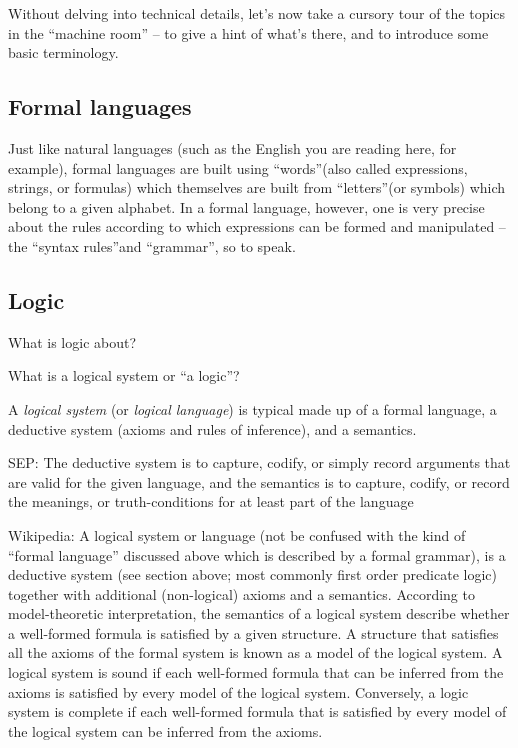 Without delving into technical details, let's now take a cursory tour of the topics in the ``machine room'' -- to give a hint of what's there, and to introduce some basic terminology.

\subsection{Formal languages}

Just like natural languages (such as the English you are reading here, for example), formal languages are built using ``words''(also called expressions, strings, or formulas) which themselves are built from ``letters''(or symbols) which belong to a given alphabet.
In a formal language, however, one is very precise about the rules according to which expressions can be formed and manipulated -- the ``syntax rules''and ``grammar'', so to speak.


\subsection{Logic}

What is logic about?

What is a logical system or ``a logic''?

A \emph{logical system} (or \emph{logical language}) is typical made up of a formal language, a deductive system (axioms and rules of inference), and a semantics.

SEP: The deductive system is to capture, codify, or simply record arguments that are valid for the given language, and the semantics is to capture, codify, or record the meanings, or truth-conditions for at least part of the language

Wikipedia: A logical system or language (not be confused with the kind of ``formal language'' discussed above which is described by a formal grammar), is a deductive system (see section above; most commonly first order predicate logic) together with additional (non-logical) axioms and a semantics.
According to model-theoretic interpretation, the semantics of a logical system describe whether a well-formed formula is satisfied by a given structure.
A structure that satisfies all the axioms of the formal system is known as a model of the logical system.
A logical system is sound if each well-formed formula that can be inferred from the axioms is satisfied by every model of the logical system.
Conversely, a logic system is complete if each well-formed formula that is satisfied by every model of the logical system can be inferred from the axioms.

